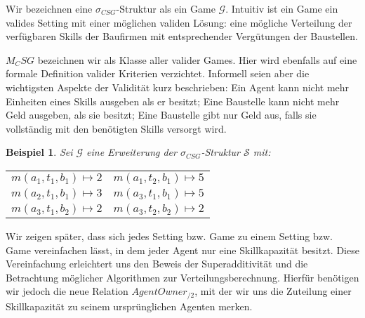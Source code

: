 \documentclass[12pt]{article}
\theoremstyle{break}
\newtheorem{bsp}{Beispiel}
\begin{document}
\noindent
Wir bezeichnen eine $\sigma_{CSG}$-Struktur als ein Game $\mathcal{G}$. Intuitiv ist ein Game ein valides Setting mit einer möglichen validen Lösung: eine mögliche Verteilung der verfügbaren Skills der Baufirmen mit entsprechender Vergütungen der Baustellen.

$M_CSG$ bezeichnen wir als Klasse aller valider Games. Hier wird ebenfalls auf eine formale Definition valider Kriterien verzichtet. Informell seien aber die wichtigsten Aspekte der Validität kurz beschrieben: Ein Agent kann nicht mehr Einheiten eines Skills ausgeben als er besitzt; Eine Baustelle kann nicht mehr Geld ausgeben, als sie besitzt; Eine Baustelle gibt nur Geld aus, falls sie vollständig mit den benötigten Skills versorgt wird.

\newpage
\begin{bsp}
  Sei $\mathcal{G}$ eine Erweiterung der $\sigma_{CSG}$-Struktur $\mathcal{S}$ mit: \\
  
  \noindent
  \setlength{\tabcolsep}{24pt}
  \begin{tabular}{l|l}
    $m(a_1, t_1, b_1) \mapsto 2 $&$ m(a_1, t_2, b_1) \mapsto 5$ \\
    $m(a_2, t_1, b_1) \mapsto 3 $&$ m(a_3, t_1, b_1) \mapsto 5$ \\
    $m(a_3, t_1, b_2) \mapsto 2 $&$ m(a_3, t_2, b_2) \mapsto 2$
  \end{tabular}
\end{bsp}

\noindent
Wir zeigen später, dass sich jedes Setting bzw. Game zu einem Setting bzw. Game vereinfachen lässt, in dem jeder Agent nur eine Skillkapazität besitzt. Diese Vereinfachung erleichtert uns den Beweis der Superadditivität und die Betrachtung möglicher Algorithmen zur Verteilungsberechnung. Hierfür benötigen wir jedoch die neue Relation $AgentOwner_{/2}$, mit der wir uns die Zuteilung einer Skillkapazität zu seinem ursprünglichen Agenten merken.
\end{document}
